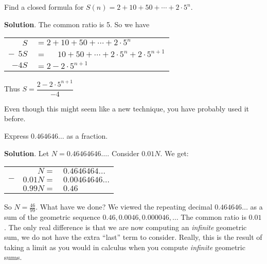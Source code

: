 \documentclass[11pt,]{book}
\theoremstyle{ptxplainnotitle}
\theoremstyle{ptxplaintitle}
\theoremstyle{ptxdefinitionnotitle}
\theoremstyle{ptxdefinitiontitle}
\theoremstyle{ptxdefinitionnotitle}
\theoremstyle{ptxdefinitiontitle}
\theoremstyle{ptxdefinitionnotitle}
\theoremstyle{ptxdefinitiontitle}
\theoremstyle{ptxdefinitiontitlenonumber}
\theoremstyle{ptxdefinitiontitlenonumber}
\numberwithin{equation}{chapter}
\newcommand{\hrulethin}  {\noalign{\hrule height 0.04em}}
\begin{document}
\begin{example}\label{example-11}
\hypertarget{p-213}{}%
Find a closed formula for \(S(n) = 2 + 10 + 50 + \cdots + 2\cdot 5^n\).%
\par\smallskip%
\noindent\textbf{Solution}.\hypertarget{solution-19}{}\quad%
\hypertarget{p-214}{}%
The common ratio is 5. So we have%
\begin{sidebyside}{1}{0}{0}{0}
\begin{sbspanel}{1}
{\centering%
\begin{tabular}{rl}
\(S\)&\(= 2 + 10 + 50 + \cdots + 2\cdot 5^n\)\tabularnewline[0pt]
\(-~~5S\)&\(= ~~~~~~10 + 50 + \cdots + 2\cdot 5^n + 2\cdot5^{n+1}\)\tabularnewline\hrulethin
\(-4S\)&\(= 2  - 2\cdot5^{n+1}\)
\end{tabular}
\par}
\end{sbspanel}
\end{sidebyside}
\par
\hypertarget{p-215}{}%
Thus \(S = \dfrac{2-2\cdot 5^{n+1}}{-4}\)%
\end{example}
\hypertarget{p-216}{}%
Even though this might seem like a new technique, you have probably used it before.%
\begin{example}\label{example-12}
\hypertarget{p-217}{}%
Express \(0.464646\ldots\) as a fraction.%
\par\smallskip%
\noindent\textbf{Solution}.\hypertarget{solution-20}{}\quad%
\hypertarget{p-218}{}%
Let \(N = 0.46464646\ldots\). Consider \(0.01N\). We get:%
\begin{sidebyside}{1}{0}{0}{0}
\begin{sbspanel}{1}
{\centering%
\begin{tabular}{lrl}
&\(N =\)&\(0.4646464\ldots\)\tabularnewline[0pt]
\(-\)&\(0.01N =\)&\(0.00464646\ldots\)\tabularnewline\hrulethin
&\(0.99N =\)&\(0.46\)
\end{tabular}
\par}
\end{sbspanel}
\end{sidebyside}
\par
\hypertarget{p-219}{}%
So \(N = \frac{46}{99}\). What have we done? We viewed the repeating decimal \(0.464646\ldots\) as a sum of the geometric sequence \(0.46, 0.0046, 0.000046, \ldots\) The common ratio is \(0.01\). The only real difference is that we are now computing an \emph{infinite} geometric sum, we do not have the extra ``last'' term to consider. Really, this is the result of taking a limit as you would in calculus when you compute \emph{infinite} geometric sums.%
\end{example}
\typeout{************************************************}
\typeout{************************************************}
\end{document}

